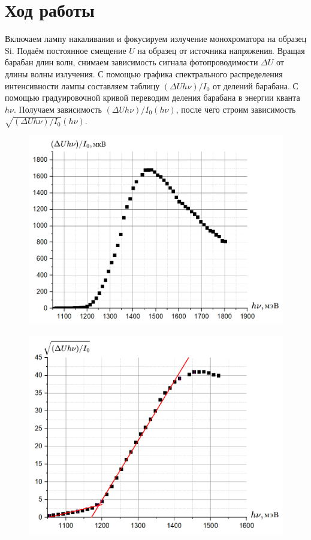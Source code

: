 \documentclass[a4paper, 12pt]{article}
\begin{document}
\section{Ход работы}
 
    Включаем лампу накаливания и фокусируем излучение монохроматора на образец Si. Подаём постоянное смещение $U$ на образец от источника напряжения. Вращая барабан длин волн, снимаем зависимость сигнала фотопроводимости $\Delta U$ от длины волны излучения. С помощью графика спектрального распределения интенсивности лампы составляем таблицу $(\Delta Uh\nu)/I_0$ от делений барабана. С помощью градуировочной кривой переводим деления барабана в энергии кванта $h\nu$. Получаем зависимость $(\Delta Uh\nu)/I_0(h\nu)$, после чего строим зависимость $\sqrt{(\Delta Uh\nu)/I_0}(h\nu)$.
    \begin{figure}[h!]
\begin{center}
\begin{minipage}[h!]{0.495\linewidth}
\includegraphics[width=1\linewidth]{img/l1.png}
\label{ris:experimoriginal} %
\end{minipage}
\hfill 
\begin{minipage}[h!]{0.495\linewidth}
\includegraphics[width=1\linewidth]{img/l2.png}


\end{minipage}
\end{center}
\end{figure}
\end{document}
